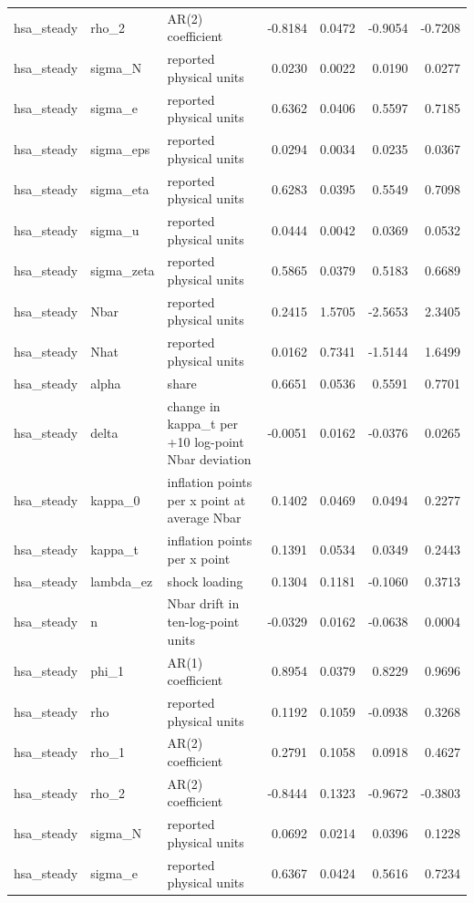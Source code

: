 \begin{tabular}{lllrrrr}
hsa\_steady & rho\_2 & AR(2) coefficient & -0.8184 & 0.0472 & -0.9054 & -0.7208 \\
hsa\_steady & sigma\_N & reported physical units & 0.0230 & 0.0022 & 0.0190 & 0.0277 \\
hsa\_steady & sigma\_e & reported physical units & 0.6362 & 0.0406 & 0.5597 & 0.7185 \\
hsa\_steady & sigma\_eps & reported physical units & 0.0294 & 0.0034 & 0.0235 & 0.0367 \\
hsa\_steady & sigma\_eta & reported physical units & 0.6283 & 0.0395 & 0.5549 & 0.7098 \\
hsa\_steady & sigma\_u & reported physical units & 0.0444 & 0.0042 & 0.0369 & 0.0532 \\
hsa\_steady & sigma\_zeta & reported physical units & 0.5865 & 0.0379 & 0.5183 & 0.6689 \\
hsa\_steady & Nbar & reported physical units & 0.2415 & 1.5705 & -2.5653 & 2.3405 \\
hsa\_steady & Nhat & reported physical units & 0.0162 & 0.7341 & -1.5144 & 1.6499 \\
hsa\_steady & alpha & share & 0.6651 & 0.0536 & 0.5591 & 0.7701 \\
hsa\_steady & delta & change in kappa\_t per +10 log-point Nbar deviation & -0.0051 & 0.0162 & -0.0376 & 0.0265 \\
hsa\_steady & kappa\_0 & inflation points per x point at average Nbar & 0.1402 & 0.0469 & 0.0494 & 0.2277 \\
hsa\_steady & kappa\_t & inflation points per x point & 0.1391 & 0.0534 & 0.0349 & 0.2443 \\
hsa\_steady & lambda\_ez & shock loading & 0.1304 & 0.1181 & -0.1060 & 0.3713 \\
hsa\_steady & n & Nbar drift in ten-log-point units & -0.0329 & 0.0162 & -0.0638 & 0.0004 \\
hsa\_steady & phi\_1 & AR(1) coefficient & 0.8954 & 0.0379 & 0.8229 & 0.9696 \\
hsa\_steady & rho & reported physical units & 0.1192 & 0.1059 & -0.0938 & 0.3268 \\
hsa\_steady & rho\_1 & AR(2) coefficient & 0.2791 & 0.1058 & 0.0918 & 0.4627 \\
hsa\_steady & rho\_2 & AR(2) coefficient & -0.8444 & 0.1323 & -0.9672 & -0.3803 \\
hsa\_steady & sigma\_N & reported physical units & 0.0692 & 0.0214 & 0.0396 & 0.1228 \\
hsa\_steady & sigma\_e & reported physical units & 0.6367 & 0.0424 & 0.5616 & 0.7234 \\

\end{tabular}
